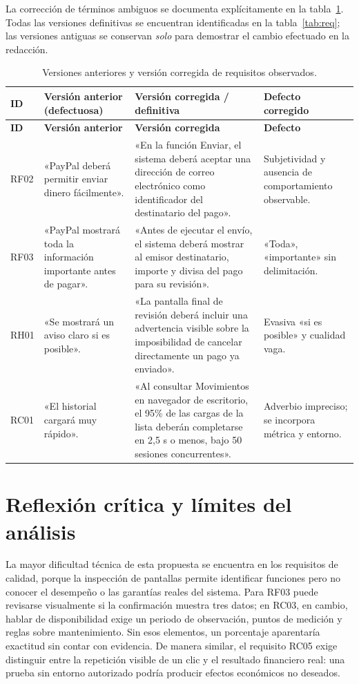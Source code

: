 \documentclass[10pt,a4paper]{extarticle}
\begin{document}
\endgroup
La corrección de términos ambiguos se documenta explícitamente en la tabla~\ref{tab:correcciones}. Todas las versiones definitivas se encuentran identificadas en la tabla~\ref{tab:req}; las versiones antiguas se conservan \emph{solo} para demostrar el cambio efectuado en la redacción.
\begingroup\footnotesize
\begin{longtable}{@{}p{1.0cm}p{5.6cm}p{6.55cm}p{3.4cm}@{}}
\caption{Versiones anteriores y versión corregida de requisitos observados.}\label{tab:correcciones}\\
\toprule \textbf{ID}&\textbf{Versión anterior (defectuosa)}&\textbf{Versión corregida / definitiva}&\textbf{Defecto corregido}\\\midrule\endfirsthead
\toprule \textbf{ID}&\textbf{Versión anterior}&\textbf{Versión corregida}&\textbf{Defecto}\\\midrule\endhead
RF02&«PayPal deberá permitir enviar dinero fácilmente».&«En la función Enviar, el sistema deberá aceptar una dirección de correo electrónico como identificador del destinatario del pago».&Subjetividad y ausencia de comportamiento observable.\\
RF03&«PayPal mostrará toda la información importante antes de pagar».&«Antes de ejecutar el envío, el sistema deberá mostrar al emisor destinatario, importe y divisa del pago para su revisión».&«Toda», «importante» sin delimitación.\\
RH01&«Se mostrará un aviso claro si es posible».&«La pantalla final de revisión deberá incluir una advertencia visible sobre la imposibilidad de cancelar directamente un pago ya enviado».&Evasiva «si es posible» y cualidad vaga.\\
RC01&«El historial cargará muy rápido».&«Al consultar Movimientos en navegador de escritorio, el 95\% de las cargas de la lista deberán completarse en 2,5 s o menos, bajo 50 sesiones concurrentes».&Adverbio impreciso; se incorpora métrica y entorno.\\
\bottomrule
\end{longtable}
\endgroup

\section{Reflexión crítica y límites del análisis}
La mayor dificultad técnica de esta propuesta se encuentra en los requisitos de calidad, porque la inspección de pantallas permite identificar funciones pero no conocer el desempeño o las garantías reales del sistema. Para RF03 puede revisarse visualmente si la confirmación muestra tres datos; en RC03, en cambio, hablar de disponibilidad exige un periodo de observación, puntos de medición y reglas sobre mantenimiento. Sin esos elementos, un porcentaje aparentaría exactitud sin contar con evidencia. De manera similar, el requisito RC05 exige distinguir entre la repetición visible de un clic y el resultado financiero real: una prueba sin entorno autorizado podría producir efectos económicos no deseados.
\end{document}
